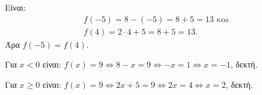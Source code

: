 
\begin{alist}
\item Είναι:
\begin{gather*}
f(-5) = 8 - (-5) = 8 + 5 = 13\text{ και} \\
f(4) = 2 \cdot 4 + 5 = 8 + 5 = 13.
\end{gather*}
Άρα $f(-5) = f(4)$.

\item Για $x < 0$ είναι:
$f(x) = 9 \Leftrightarrow 8 - x = 9 \Leftrightarrow -x = 1 \Leftrightarrow x = -1$, δεκτή.

Για $x \ge 0$ είναι:
$f(x) = 9 \Leftrightarrow 2x + 5 = 9 \Leftrightarrow 2x = 4 \Leftrightarrow x = 2$, δεκτή.
\end{alist}

